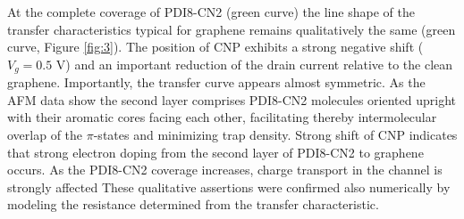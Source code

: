 \documentclass[preprint,aip,jap]{revtex4-2}
\begin{document}
At the complete coverage of PDI8-CN2 (green curve) the line shape of the transfer characteristics typical for graphene remains qualitatively the same (green curve, Figure \ref{fig:3}).
  The position of CNP exhibits a strong negative shift ($V_g=0.5$ V) and an important reduction of the drain current relative to the clean graphene.
 Importantly, the transfer curve appears almost symmetric.
  As the AFM data show the second layer comprises PDI8-CN2 molecules oriented upright with their aromatic cores facing each other, facilitating thereby intermolecular overlap of the $\pi$-states and minimizing trap density.
  Strong shift of CNP indicates that strong electron doping from the second layer of PDI8-CN2 to  graphene occurs.
 As the PDI8-CN2 coverage increases, charge transport in the channel is strongly affected
These qualitative assertions were confirmed also numerically by modeling the resistance determined from the transfer characteristic.
 
\end{document}
